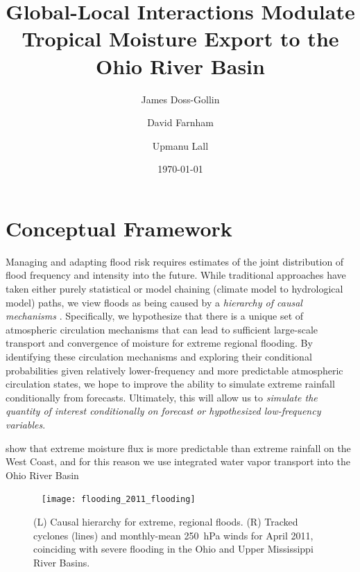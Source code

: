 \documentclass[12pt]{article}
\title{Global-Local Interactions Modulate Tropical Moisture Export to the Ohio River Basin}
\author[1,2]{James Doss-Gollin}
\author[1,2]{David Farnham}
\author[1,2]{Upmanu Lall}
\affil[1]{Columbia Water Center}
\affil[2]{Department of Earth and Environmental Engineering, Columbia University}
\date{\today}
\begin{document}
\def\ci{\perp\!\!\!\perp}
\def\ex{\mathbb{E}}
\def\prob{\mathbb{P}}
\def\ind{\mathbb{I}}
\def\grad{\triangledown}
\def\bigo{\mathcal{O}}
\def\normal{\mathcal{N}}
\def\bern{\text{Bernoulli}}
\def\logit{\text{logit}}
\def\binom{\text{Bin}}
\def\poiss{\text{Poiss}}
\def\cauchy{\text{Cauchy}}
\def\sigmoid{\vb{\sigma}}
\def\given{\big|}
\def\stan{\texttt{Stan~}}
\maketitle



\section{Conceptual Framework}

Managing and adapting flood risk requires estimates of the joint distribution of flood frequency and intensity into the future.
While traditional approaches have taken either purely statistical or model chaining (climate model to hydrological model) paths, we view floods as being caused by a \emph{hierarchy of causal mechanisms} \cite[see][]{Merz2014}.
Specifically, we hypothesize that there is a unique set of atmospheric circulation mechanisms that can lead to sufficient large-scale transport and convergence of moisture for extreme regional flooding.
By identifying these circulation mechanisms and exploring their conditional probabilities given relatively lower-frequency and more predictable atmospheric circulation states, we hope to improve the ability to simulate extreme rainfall conditionally from forecasts.
Ultimately, this will allow us to \emph{simulate the quantity of interest conditionally on forecast or hypothesized low-frequency variables}.



\citet{Lavers2016} show that extreme moisture flux is more predictable than extreme rainfall on the West Coast, and for this reason we use integrated water vapor transport into the Ohio River Basin

\begin{figure}
    ~\hfill
    \texttt{[image: flooding\_2011\_flooding]}
    \caption{(L) Causal hierarchy for extreme, regional floods. (R) Tracked cyclones (lines) and monthly-mean \SI{250}{\hecto\pascal} winds for April 2011, coinciding with severe flooding in the Ohio and Upper Mississippi River Basins.}
    \label{fig:apr2011}
\end{figure}
\end{document}
